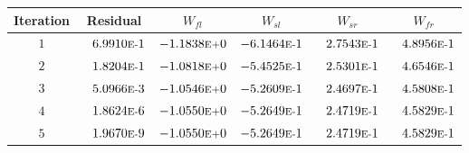 \begin{tabular*}{\textwidth}{@{\extracolsep{\fill}} cccccc}
\\ 
\hline 
\hline 
Iteration & Residual & $W_{fl}$ & $W_{sl}$ & $W_{sr}$ & $W_{fr}$ \\ 
\hline 
$1$ & $\phantom{-} 6.9910\mbox{\sc{e}\smaller{-}}1$ & $-1.1838\mbox{\sc{e}\smaller{+}}0$ & $-6.1464\mbox{\sc{e}\smaller{-}}1$ & $\phantom{-} 2.7543\mbox{\sc{e}\smaller{-}}1$ & $\phantom{-} 4.8956\mbox{\sc{e}\smaller{-}}1$ \\ 
$2$ & $\phantom{-} 1.8204\mbox{\sc{e}\smaller{-}}1$ & $-1.0818\mbox{\sc{e}\smaller{+}}0$ & $-5.4525\mbox{\sc{e}\smaller{-}}1$ & $\phantom{-} 2.5301\mbox{\sc{e}\smaller{-}}1$ & $\phantom{-} 4.6546\mbox{\sc{e}\smaller{-}}1$ \\ 
$3$ & $\phantom{-} 5.0966\mbox{\sc{e}\smaller{-}}3$ & $-1.0546\mbox{\sc{e}\smaller{+}}0$ & $-5.2609\mbox{\sc{e}\smaller{-}}1$ & $\phantom{-} 2.4697\mbox{\sc{e}\smaller{-}}1$ & $\phantom{-} 4.5808\mbox{\sc{e}\smaller{-}}1$ \\ 
$4$ & $\phantom{-} 1.8624\mbox{\sc{e}\smaller{-}}6$ & $-1.0550\mbox{\sc{e}\smaller{+}}0$ & $-5.2649\mbox{\sc{e}\smaller{-}}1$ & $\phantom{-} 2.4719\mbox{\sc{e}\smaller{-}}1$ & $\phantom{-} 4.5829\mbox{\sc{e}\smaller{-}}1$ \\ 
$5$ & $\phantom{-} 1.9670\mbox{\sc{e}\smaller{-}}9$ & $-1.0550\mbox{\sc{e}\smaller{+}}0$ & $-5.2649\mbox{\sc{e}\smaller{-}}1$ & $\phantom{-} 2.4719\mbox{\sc{e}\smaller{-}}1$ & $\phantom{-} 4.5829\mbox{\sc{e}\smaller{-}}1$ \\ 
\hline 
\end{tabular*} 
